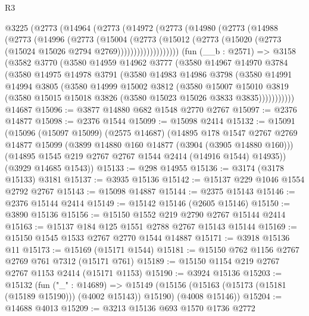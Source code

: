 \begin{lexlean}{R3}
\begin{coremodule}
    @3225
      (@2773
        (@14964
          (@2773
            (@14972
              (@2773
                (@14980
                  (@2773
                    (@14988
                      (@2773
                        (@14996
                          (@2773
                            (@15004
                              (@2773
                                (@15012
                                  (@2773
                                    (@15020 (@2773 (@15024 @15026 @2794 @2769)))))))))))))))))))
    (fun (__b : @2571) =>
    @3158
      (@3582
        @3770
        (@3580
          @14959
          @14962
          @3777
          (@3580
            @14967
            @14970
            @3784
            (@3580
              @14975
              @14978
              @3791
              (@3580
                @14983
                @14986
                @3798
                (@3580
                  @14991
                  @14994
                  @3805
                  (@3580
                    @14999
                    @15002
                    @3812
                    (@3580
                      @15007
                      @15010
                      @3819
                      (@3580 @15015 @15018 @3826 (@3580 @15023 @15026 @3833 @3835)))))))))))
    @14687
@15096 := @3877 @14880 @682 @1548 @2770 @2767
@15097 := @2376 @14877
@15098 := @2376 @1544
@15099 := @15098 @2414
@15132 := @15091
    (@15096
      (@15097 @15099)
      (@2575 @14687)
      (@14895
        @178
        @1547
        @2767
        @2769
        @14877
        @15099
        (@3899 @14880 @160 @14877 (@3904 (@3905 @14880 @160)))
        (@14895 @1545 @219 @2767 @2767 @1544 @2414 (@14916 @1544) @14935))
      (@3929 @14685 @1543))
@15133 := @298 @14955
@15136 := @3174 (@3178 @15133) @3181
@15137 := @3935 @15136
@15142 := @15137 @229 @1046 @1554 @2792 @2767
@15143 := @15098 @14887
@15144 := @2375 @15143
@15146 := @2376 @15144 @2414
@15149 := @15142 @15146 (@2605 @15146)
@15150 := @3890 @15136
@15156 := @15150 @1552 @219 @2790 @2767 @15144 @2414
@15163 := @15137 @184 @125 @1551 @2788 @2767 @15143 @15144
@15169 := @15150 @1545 @1533 @2767 @2770 @1544 @14887
@15171 := @3918 @15136 @11
@15173 := @15169 (@15171 @1544)
@15181 := @15150 @762 @1156 @2767 @2769 @761 @7312 (@15171 @761)
@15189 := @15150 @1154 @219 @2767 @2767 @1153 @2414 (@15171 @1153)
@15190 := @3924 @15136
@15203 := @15132
    (fun ("_" : @14689) =>
    @15149 (@15156 (@15163 (@15173 (@15181 (@15189 @15190))) (@4002 @15143)) @15190) (@4008 @15146))
@15204 := @14688 @4013
@15209 := @3213 @15136 @693 @1570 @1736 @2772

\end{coremodule}
\end{lexlean}
